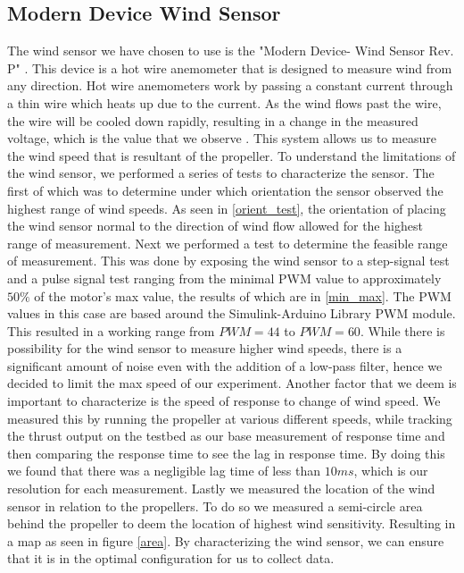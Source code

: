 \documentclass[conference]{IEEEtran}
\begin{document}
\subsection{Modern Device Wind Sensor}
The wind sensor we have chosen to use is the "Modern Device- Wind Sensor Rev. P" \cite{md}. This device is a hot wire anemometer that is designed to measure wind from any direction. Hot wire anemometers work by passing a constant current through a thin wire which heats up due to the current. As the wind flows past the wire, the wire will be cooled down rapidly, resulting in a change in the measured voltage, which is the value that we observe \cite{hot_wire}. This system allows us to measure the wind speed that is resultant of the propeller. 
To understand the limitations of the wind sensor, we performed a series of tests to characterize the sensor. The first of which was to determine under which orientation the sensor observed the highest range of wind speeds. As seen in \ref{orient_test}, the orientation of placing the wind sensor normal to the direction of wind flow allowed for the highest range of measurement. Next we performed a test to determine the feasible range of measurement. This was done by exposing the wind sensor to a step-signal test and a pulse signal test ranging from the minimal PWM value to approximately $50\%$ of the motor's max value, the results of which are in \ref{min_max}. The PWM values in this case are based around the Simulink-Arduino Library PWM module.  This resulted in a working range from $PWM = 44$ to $PWM = 60$. While there is possibility for the wind sensor to measure higher wind speeds, there is a significant amount of noise even with the addition of a low-pass filter, hence we decided to limit the max speed of our experiment. 
Another factor that we deem is important to characterize is the speed of response to change of wind speed. We measured this by running the propeller at various different speeds, while tracking the thrust output on the testbed as our base measurement of response time and then comparing the response time to see the lag in response time. By doing this we found that there was a negligible lag time of less than $10 ms$, which is our resolution for each measurement.
Lastly we measured the location of the wind sensor in relation to the propellers. To do so we measured a semi-circle area behind the propeller to deem the location of highest wind sensitivity. Resulting in a map as seen in figure \ref{area}. 
By characterizing the wind sensor, we can ensure that it is in the optimal configuration for us to collect data.
\end{document}
